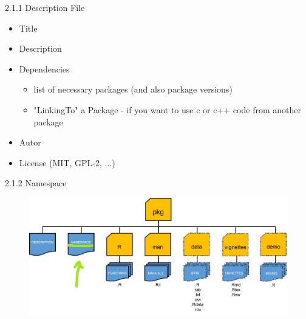 \documentclass[11pt,a4paper]{beamer}
\begin{document}
\begin{frame}[t]{2.1.1 Description File}
	
	\begin{itemize}
		\item Title	
		\item Description
		\item Dependencies
		\begin{itemize}
			\item  list of necessary packages (and also package versions)
			\item "LinkingTo" a Package - if you want to use c or c++ code from another package
		\end{itemize}
		\item Autor	
		\item License (MIT, GPL-2, ...)
		
	\end{itemize}
	
\end{frame}




\begin{frame}[t]{2.1.2 Namespace}
	
	
	\begin{figure}
		\centering
		\includegraphics[width=0.9\linewidth]{Names}
		\label{fig:packages}
	\end{figure}
	
	
\end{frame}
\end{document}
